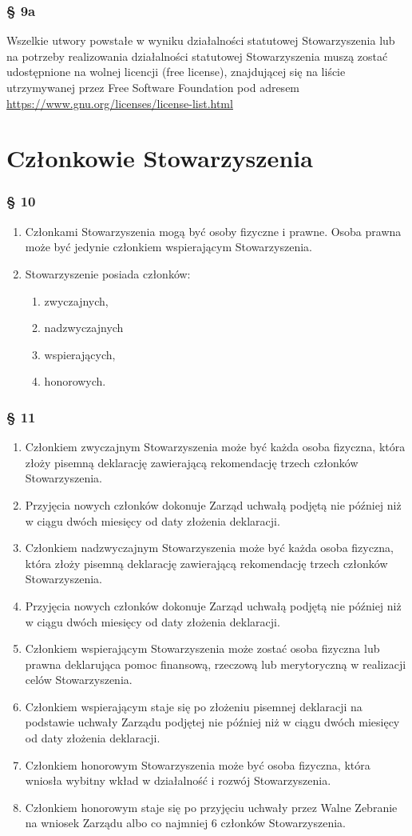 \documentclass{article}
\newcommand{\myparagraph}[1]{\subsubsection*{#1}}
\begin{document}
\myparagraph{§ 9a}
Wszelkie utwory powstałe w wyniku działalności statutowej Stowarzyszenia lub na potrzeby realizowania działalności statutowej Stowarzyszenia muszą zostać udostępnione na wolnej licencji (free license), znajdującej się na liście utrzymywanej przez Free Software Foundation pod adresem \url{https://www.gnu.org/licenses/license-list.html}

\section{Członkowie Stowarzyszenia}
\myparagraph{§ 10}
\begin{enumerate}
\item
  Członkami Stowarzyszenia mogą być osoby fizyczne i prawne. Osoba prawna może być jedynie członkiem wspierającym Stowarzyszenia.
\item
  Stowarzyszenie posiada członków:
  \begin{enumerate}
  \def\labelenumii{\alph{enumii}.}
  \item
    zwyczajnych,
  \item
    nadzwyczajnych
  \item
    wspierających,
  \item
    honorowych.
  \end{enumerate}
\end{enumerate}

\myparagraph{§ 11}
\begin{enumerate}
\item
  Członkiem zwyczajnym Stowarzyszenia może być każda osoba fizyczna, która złoży pisemną deklarację zawierającą rekomendację trzech członków Stowarzyszenia.
\item
  Przyjęcia nowych członków dokonuje Zarząd uchwałą podjętą nie później niż w ciągu dwóch miesięcy od daty złożenia deklaracji.
\item
  Członkiem nadzwyczajnym Stowarzyszenia może być każda osoba fizyczna, która złoży pisemną deklarację zawierającą rekomendację trzech członków Stowarzyszenia.
\item
  Przyjęcia nowych członków dokonuje Zarząd uchwałą podjętą nie później niż w ciągu dwóch miesięcy od daty złożenia deklaracji.
\item
  Członkiem wspierającym Stowarzyszenia może zostać osoba fizyczna lub prawna deklarująca pomoc finansową, rzeczową lub merytoryczną w realizacji celów Stowarzyszenia.
\item
  Członkiem wspierającym staje się po złożeniu pisemnej deklaracji na podstawie uchwały Zarządu podjętej nie później niż w ciągu dwóch miesięcy od daty złożenia deklaracji.
\item
  Członkiem honorowym Stowarzyszenia może być osoba fizyczna, która wniosła wybitny wkład w działalność i rozwój Stowarzyszenia.
\item
  Członkiem honorowym staje się po przyjęciu uchwały przez Walne Zebranie na wniosek Zarządu albo co najmniej 6 członków Stowarzyszenia.
\end{enumerate}
\end{document}
